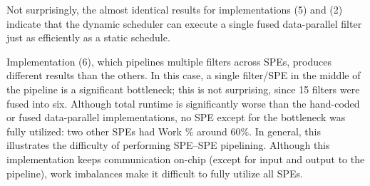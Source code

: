 Not surprisingly, the almost identical results for implementations \textsf{(5)} and \textsf{(2)} indicate that the dynamic scheduler can execute a single fused data-parallel filter just as efficiently as a static schedule.

Implementation \textsf{(6)}, which pipelines multiple filters across SPEs, produces different results than the others. In this case, a single filter/SPE in the middle of the pipeline is a significant bottleneck; this is not surprising, since 15 filters were fused into six. Although total runtime is significantly worse than the hand-coded or fused data-parallel implementations, no SPE except for the bottleneck was fully utilized: two other SPEs had Work \% around 60\%. In general, this illustrates the difficulty of performing SPE--SPE pipelining. Although this implementation keeps communication on-chip (except for input and output to the pipeline), work imbalances make it difficult to fully utilize all SPEs.
